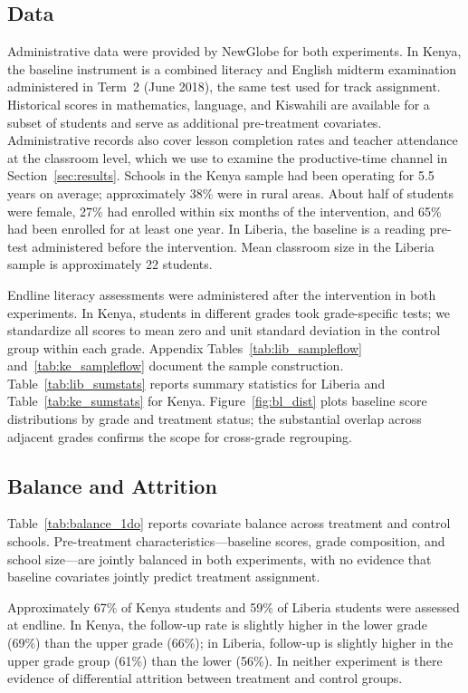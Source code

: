 \documentclass[11pt]{article}
\begin{document}
\subsection{Data}

Administrative data were provided by NewGlobe for both experiments. In Kenya, the baseline instrument is a combined literacy and English midterm examination administered in Term~2 (June 2018), the same test used for track assignment. Historical scores in mathematics, language, and Kiswahili are available for a subset of students and serve as additional pre-treatment covariates. Administrative records also cover lesson completion rates and teacher attendance at the classroom level, which we use to examine the productive-time channel in Section~\ref{sec:results}. Schools in the Kenya sample had been operating for 5.5 years on average; approximately 38\% were in rural areas. About half of students were female, 27\% had enrolled within six months of the intervention, and 65\% had been enrolled for at least one year. In Liberia, the baseline is a reading pre-test administered before the intervention. Mean classroom size in the Liberia sample is approximately 22 students.

Endline literacy assessments were administered after the intervention in both experiments. In Kenya, students in different grades took grade-specific tests; we standardize all scores to mean zero and unit standard deviation in the control group within each grade. Appendix Tables~\ref{tab:lib_sampleflow} and~\ref{tab:ke_sampleflow} document the sample construction. Table~\ref{tab:lib_sumstats} reports summary statistics for Liberia and Table~\ref{tab:ke_sumstats} for Kenya. Figure~\ref{fig:bl_dist} plots baseline score distributions by grade and treatment status; the substantial overlap across adjacent grades confirms the scope for cross-grade regrouping.

\subsection{Balance and Attrition}

Table~\ref{tab:balance_1do} reports covariate balance across treatment and control schools. Pre-treatment characteristics---baseline scores, grade composition, and school size---are jointly balanced in both experiments, with no evidence that baseline covariates jointly predict treatment assignment.

Approximately 67\% of Kenya students and 59\% of Liberia students were assessed at endline. In Kenya, the follow-up rate is slightly higher in the lower grade (69\%) than the upper grade (66\%); in Liberia, follow-up is slightly higher in the upper grade group (61\%) than the lower (56\%). In neither experiment is there evidence of differential attrition between treatment and control groups.
\end{document}

